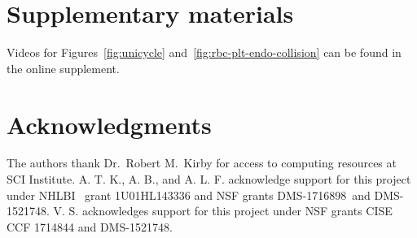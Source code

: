 \documentclass[1p,preprint,fleqn,number,sort&compress,times]{elsarticle}
\begin{document}
\section{Supplementary materials}\label{sec:supp}
Videos for Figures~\ref{fig:unicycle} and~\ref{fig:rbc-plt-endo-collision} can be found
in the online supplement.

\section*{Acknowledgments}
The authors thank Dr.\ Robert M.\ Kirby for access to computing resources at SCI
Institute. A. T. K., A. B., and A. L. F. acknowledge support for this project under NHLBI 
grant 1U01HL143336 and NSF grants DMS-1716898 and DMS-1521748. V. S. acknowledges support
for this project under NSF grants CISE CCF 1714844 and DMS-1521748.


\end{document}
